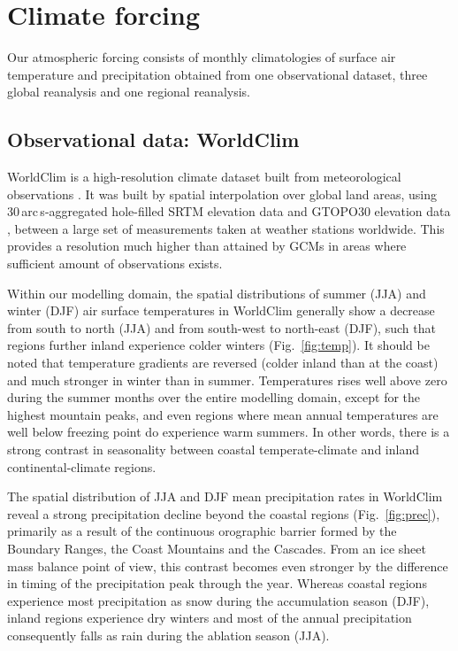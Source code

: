 \section{Climate forcing}
\label{sec:climate}

Our atmospheric forcing consists of monthly climatologies of surface air temperature and precipitation obtained from one observational dataset, three global reanalysis and one regional reanalysis.

\subsection{Observational data: WorldClim}

WorldClim is a high-resolution climate dataset built from meteorological observations \citep{data:worldclim}. It was built by spatial interpolation over global land areas, using 30\,arc\,s-aggregated hole-filled SRTM elevation data \citep{data:srtm} and GTOPO30 elevation data \citep{data:gtopo30}, between a large set of measurements taken at weather stations worldwide. This provides a resolution much higher than attained by GCMs in areas where sufficient amount of observations exists.

Within our modelling domain, the spatial distributions of summer (JJA) and winter (DJF) air surface temperatures in WorldClim generally show a decrease from south to north (JJA) and from south-west to north-east (DJF), such that regions further inland experience colder winters (Fig.~\ref{fig:temp}). It should be noted that temperature gradients are reversed (colder inland than at the coast) and much stronger in winter than in summer. Temperatures rises well above zero during the summer months over the entire modelling domain, except for the highest mountain peaks, and even regions where mean annual temperatures are well below freezing point do experience warm summers. In other words, there is a strong contrast in seasonality between coastal temperate-climate and inland continental-climate regions.

The spatial distribution of JJA and DJF mean precipitation rates in WorldClim reveal a strong precipitation decline beyond the coastal regions (Fig.~\ref{fig:prec}), primarily as a result of the continuous orographic barrier formed by the Boundary Ranges, the Coast Mountains and the Cascades. From an ice sheet mass balance point of view, this contrast becomes even stronger by the difference in timing of the precipitation peak through the year. Whereas coastal regions experience most precipitation as snow during the accumulation season (DJF), inland regions experience dry winters and most of the annual precipitation consequently falls as rain during the ablation season (JJA).

